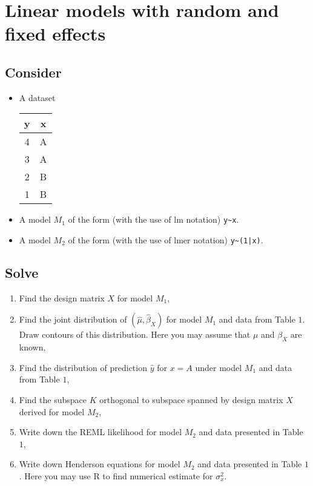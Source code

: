 \documentclass[a4paper,11pt,twoside,openany]{article}
\begin{document}
\section*{Linear models with random and fixed effects}

\subsection*{Consider}

\begin{itemize}
\item A dataset
 
\begin{tabular}{c c}
y & x \\ \hline
4 & A \\
3 & A \\
2 & B \\
1 & B \\
\end{tabular}

\item A model $M_1$ of the form (with the use of lm notation) \verb'y~x'.

\item A model $M_2$ of the form (with the use of lmer notation) \verb'y~(1|x)'.

\end{itemize}

\subsection*{Solve}

\begin{enumerate}
\item Find the design matrix $X$ for model $M_1$,
\item Find the joint distribution of $(\hat \mu, \hat \beta_X)$ for model  $M_1$ and data from Table $1$. Draw contours of this distribution. Here you may assume that $\mu$ and $\beta_X$ are known, 
\item Find the distribution of prediction $\hat y$ for $x=A$ under model $M_1$ and data from Table $1$,
\item Find the subspace $K$ orthogonal to subspace spanned by design matrix $X$ derived for model $M_2$,
\item Write down the REML likelihood for model $M_2$ and data presented in Table $1$,
\item Write down Henderson equations for model $M_2$ and data presented in Table $1$. Here you may use R to find numerical estimate for $\sigma_x^2$.
\end{enumerate}
\end{document}
